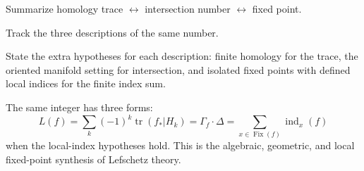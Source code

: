 \begin{exercise}\label{exr:viii35-24}
Summarize homology trace $\leftrightarrow$ intersection number $\leftrightarrow$ fixed point.
\end{exercise}
\begin{hint}
Track the three descriptions of the same number.

State the extra hypotheses for each description: finite homology for the trace, the oriented manifold setting for intersection, and isolated fixed points with defined local indices for the finite index sum.
\end{hint}
\begin{solution}
The same integer has three forms:
\[
L(f)=\sum_k(-1)^k\operatorname{tr}(f_*|H_k)
=\Gamma_f\cdot\Delta
=\sum_{x\in\operatorname{Fix}(f)}\operatorname{ind}_x(f)
\]
when the local-index hypotheses hold. This is the algebraic, geometric, and local fixed-point synthesis of Lefschetz theory.
\end{solution}
